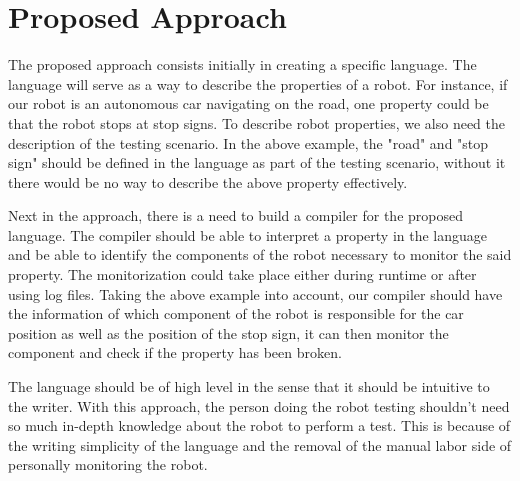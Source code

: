 \chapter{Proposed Approach}
\label{chap:approach}


The proposed approach consists initially in creating a specific language.
The language will serve as a way to describe the properties of a robot.
For instance, if our robot is an autonomous car navigating on the road, 
one property could be that the robot stops at stop signs.
To describe robot properties, we also need the description of the testing scenario.
In the above example, the "road" and "stop sign" should be defined in the language as part of the 
testing scenario, without it there would be no way to describe the above property effectively.

\par

Next in the approach, there is a need to build a compiler for the proposed language.
The compiler should be able to interpret a property in the language and be able to
identify the components of the robot necessary to monitor the said property.
The monitorization could take place either during runtime or after using log files.
Taking the above example into account, our compiler should have the information of which 
component of the robot is responsible for the car position as well as the position of the 
stop sign, it can then monitor the component and check if the property has been broken.

\par

The language should be of high level in the sense that it should be intuitive to the writer.
With this approach, the person doing the robot testing shouldn't need so much in-depth 
knowledge about the robot to perform a test. This is because of the writing simplicity of 
the language and the removal of the manual labor side of personally monitoring the robot.